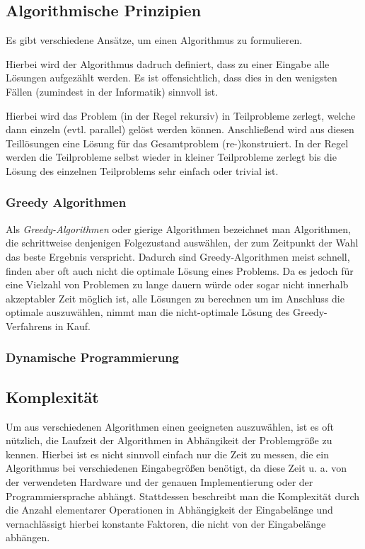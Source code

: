 \subsection{Algorithmische Prinzipien}
Es gibt verschiedene Ansätze, um einen Algorithmus zu formulieren.
\begin{defi}[Enumeration]
	Hierbei wird der Algorithmus dadruch definiert, dass zu einer Eingabe alle Lösungen aufgezählt werden. Es ist offensichtlich, dass dies in den wenigsten Fällen (zumindest in der Informatik) sinnvoll ist.
\end{defi}

\begin{defi}
	Hierbei wird das Problem (in der Regel rekursiv) in Teilprobleme zerlegt, welche dann einzeln (evtl. parallel) gelöst werden können. Anschließend wird aus diesen Teillösungen eine Lösung für das Gesamtproblem (re-)konstruiert.
	In der Regel werden die Teilprobleme selbst wieder in kleiner Teilprobleme zerlegt bis die Lösung des einzelnen Teilproblems sehr einfach oder trivial ist.
\end{defi}

\subsubsection{Greedy Algorithmen}
Als \emph{Greedy-Algorithmen} oder gierige Algorithmen bezeichnet man Algorithmen, die schrittweise denjenigen Folgezustand auswählen, der zum Zeitpunkt der Wahl das beste Ergebnis verspricht. Dadurch sind Greedy-Algorithmen meist schnell, finden aber oft auch nicht die optimale Lösung eines Problems. Da es jedoch für eine Vielzahl von Problemen zu lange dauern würde oder sogar nicht innerhalb akzeptabler Zeit möglich ist, alle Lösungen zu berechnen um im Anschluss die optimale auszuwählen, nimmt man die nicht-optimale Lösung des Greedy-Verfahrens in Kauf.

\subsubsection{Dynamische Programmierung}

\subsection{Komplexität}
Um aus verschiedenen Algorithmen einen geeigneten auszuwählen, ist es oft nützlich, die Laufzeit der Algorithmen in Abhängikeit der Problemgröße zu kennen. Hierbei ist es nicht sinnvoll einfach nur die Zeit zu messen, die ein Algorithmus bei verschiedenen Eingabegrößen benötigt, da diese Zeit u. a. von der verwendeten Hardware und der genauen Implementierung oder der Programmiersprache abhängt. Stattdessen beschreibt man die Komplexität durch die Anzahl elementarer Operationen in Abhängigkeit der Eingabelänge und vernachlässigt hierbei konstante Faktoren, die nicht von der Eingabelänge abhängen.

